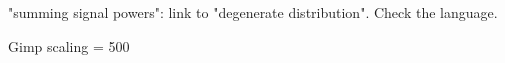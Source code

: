 "summing signal powers": link to "degenerate distribution". Check the language.

Gimp scaling = 500 
